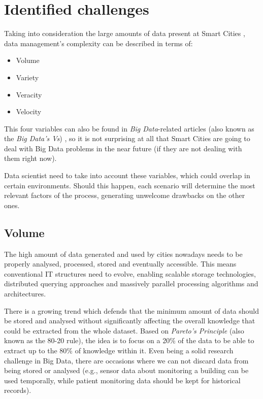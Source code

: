 \section{Identified challenges}

Taking into consideration the large amounts of data present at Smart Cities , data management's  complexity can be described in terms of:
\begin{itemize}
	\item Volume
	\item Variety
	\item Veracity
	\item Velocity
\end{itemize}

This four variables can also be found in \textit{Big Data}-related articles (also known as the \textit{Big Data's Vs}) \cite{zikopoulos2011understanding,russom2011big},  so it is not surprising at all that Smart Cities are going to deal with Big Data problems in the near future (if they are not dealing with them right now).

Data scientist need to take into account these variables, which could overlap in certain environments. Should this happen, each scenario will determine the most relevant factors of the process, generating unwelcome drawbacks on the other ones.

\subsection{Volume}

The high amount of data generated and used by cities nowadays needs to be properly analysed, processed, stored and eventually accessible. This means conventional IT structures need to evolve, enabling scalable storage technologies, distributed querying approaches and massively parallel processing algorithms and architectures.

There is a growing trend which defends that the minimum amount of data should be stored and analysed without significantly affecting the overall knowledge that could be extracted from the whole dataset. Based on \textit{Pareto's Principle} (also known as the 80-20 rule), the idea is to focus on a 20\% of the data to be able to extract up to the 80\% of knowledge within it. Even being a solid research challenge in Big Data, there are occasions where we can not discard data from being stored or analysed (e.g., sensor data about monitoring a building can be used temporally, while patient monitoring data should be kept for historical records).

